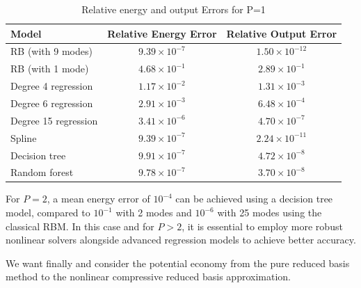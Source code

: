 \documentclass[graybox]{svmult}
\begin{document}
\begin{table}[h]
    \centering
    \begin{tabular}{|l|c|c|}
        \hline
        \textbf{Model} & \textbf{Relative Energy Error} & \textbf{Relative Output Error} \\
        \hline
        RB (with 9 modes) & $9.39 \times 10^{-7}$ & $1.50 \times 10^{-12}$ \\
        \hline
        RB (with 1 mode) & $4.68 \times 10^{-1}$ & $2.89 \times 10^{-1}$ \\
        \hline
        Degree 4 regression & $1.17 \times 10^{-2}$ & $1.31 \times 10^{-3}$ \\
        \hline
        Degree 6 regression & $2.91 \times 10^{-3}$ & $6.48 \times 10^{-4}$ \\
        \hline
        Degree 15 regression & $3.41 \times 10^{-6}$ & $4.70 \times 10^{-7}$ \\
        \hline
        Spline & $9.39 \times 10^{-7}$ & $2.24 \times 10^{-11}$ \\
        \hline
        Decision tree & $9.91 \times 10^{-7}$ & $4.72 \times 10^{-8}$ \\
        \hline
        Random forest & $9.78 \times 10^{-7}$ & $3.70 \times 10^{-8}$ \\
        \hline
    \end{tabular}
    \captionsetup{justification=centering}
    \caption{Relative energy and output Errors for P=1}
    \label{tab:errorsP1}
\end{table}

For $P=2$, a mean energy error of $10^{-4}$ can be achieved using a decision tree model, compared to $10^{-1}$ with 2 modes and $10^{-6}$ with 25 modes using the classical RBM.  In this case and for $P>2$, it is essential to employ more robust nonlinear solvers alongside advanced regression models to achieve better accuracy.

We want finally and consider the potential economy from the pure reduced basis method to the nonlinear compressive reduced basis approximation.
\end{document}
